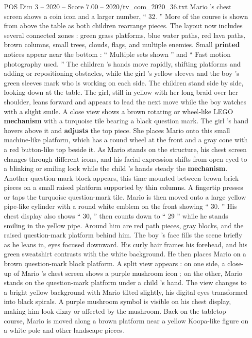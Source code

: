 \begin{textsample}{POS Dim 3 – 2020 – Score 7.00 – 2020/tv\_com\_2020\_36.txt}
Mario ’s chest screen shows a coin icon and a larger number, “ 32. ” More of the course is shown from above the table as both children rearrange pieces.
The layout now includes several connected zones : green grass platforms, blue water paths, red lava paths, brown columns, small trees, clouds, flags, and multiple enemies.
Small \textbf{printed} notices appear near the bottom : “ Multiple sets shown ” and “ Fast motion photography used. ” The children ’s hands move rapidly, shifting platforms and adding or repositioning obstacles, while the girl ’s yellow sleeves and the boy ’s green sleeves mark who is working on each side.
The children stand side by side, looking down at the table.
The girl, still in yellow with her long braid over her shoulder, leans forward and appears to lead the next move while the boy watches with a slight smile.
A close view shows a brown rotating or wheel-like LEGO \textbf{mechanism} with a turquoise tile bearing a black question mark.
The girl ’s hand hovers above it and \textbf{adjusts} the top piece.
She places Mario onto this small machine-like platform, which has a round wheel at the front and a gray cone with a red button-like top beside it.
As Mario stands on the structure, his chest screen changes through different icons, and his facial expression shifts from open-eyed to a blinking or smiling look while the child ’s hands steady the \textbf{mechanism}.
Another question-mark block appears, this time mounted between brown brick pieces on a small raised platform supported by thin columns.
A fingertip presses or taps the turquoise question-mark tile.
Mario is then moved onto a large yellow pipe-like cylinder with a round white emblem on the front showing “ 30. ” His chest display also shows “ 30, ” then counts down to “ 29 ” while he stands smiling in the yellow pipe.
Around him are red path pieces, gray blocks, and the raised question-mark platform behind him.
The boy ’s face fills the scene briefly as he leans in, eyes focused downward.
His curly hair frames his forehead, and his green sweatshirt contrasts with the white background.
He then places Mario on a brown question-mark block platform.
A split view appears : on one side, a close-up of Mario ’s chest screen shows a purple mushroom icon ; on the other, Mario stands on the question-mark platform under a child ’s hand.
The view changes to a bright yellow background with Mario tilted slightly, his digital eyes transformed into black spirals.
A purple mushroom symbol is visible on his chest display, making him look dizzy or affected by the mushroom.
Back on the tabletop course, Mario is moved along a brown platform near a yellow Koopa-like figure on a white pole and other landscape pieces.

\end{textsample}
